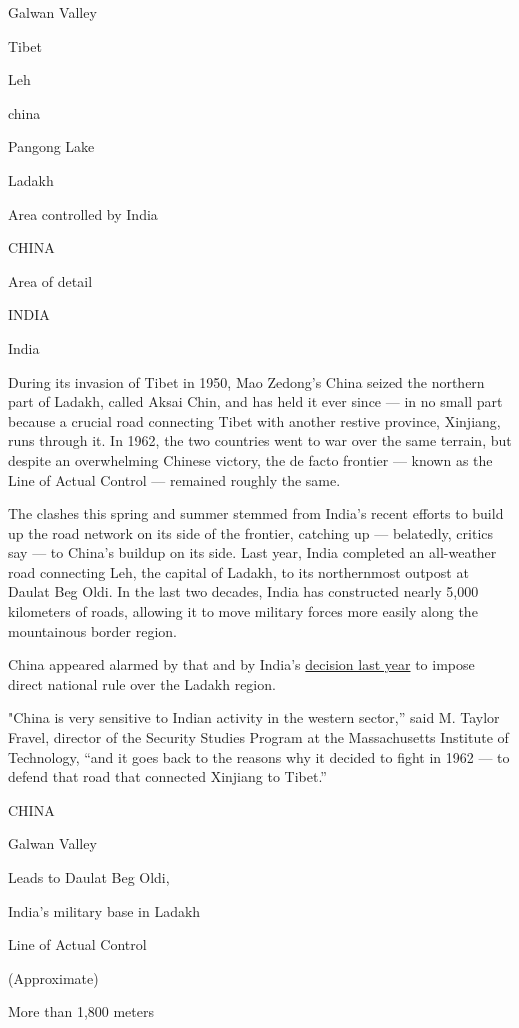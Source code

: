 Galwan Valley

Tibet

Leh

china

Pangong Lake

Ladakh

Area controlled by India

CHINA

Area of detail

INDIA

India

During its invasion of Tibet in 1950, Mao Zedong's China seized the
northern part of Ladakh, called Aksai Chin, and has held it ever since
--- in no small part because a crucial road connecting Tibet with
another restive province, Xinjiang, runs through it. In 1962, the two
countries went to war over the same terrain, but despite an overwhelming
Chinese victory, the de facto frontier --- known as the Line of Actual
Control --- remained roughly the same.

The clashes this spring and summer stemmed from India's recent efforts
to build up the road network on its side of the frontier, catching up
--- belatedly, critics say --- to China's buildup on its side. Last
year, India completed an all-weather road connecting Leh, the capital of
Ladakh, to its northernmost outpost at Daulat Beg Oldi. In the last two
decades, India has constructed nearly 5,000 kilometers of roads,
allowing it to move military forces more easily along the mountainous
border region.

China appeared alarmed by that and by India's
\href{https://www.nytimes3xbfgragh.onion/2019/08/05/world/asia/india-pakistan-kashmir-jammu.html}{decision
last year} to impose direct national rule over the Ladakh region.

"China is very sensitive to Indian activity in the western sector,''
said M. Taylor Fravel, director of the Security Studies Program at the
Massachusetts Institute of Technology, ``and it goes back to the reasons
why it decided to fight in 1962 --- to defend that road that connected
Xinjiang to Tibet.''

CHINA

Galwan Valley

Leads to Daulat Beg Oldi,

India's military base in Ladakh

Line of Actual Control

(Approximate)

More than 1,800 meters


